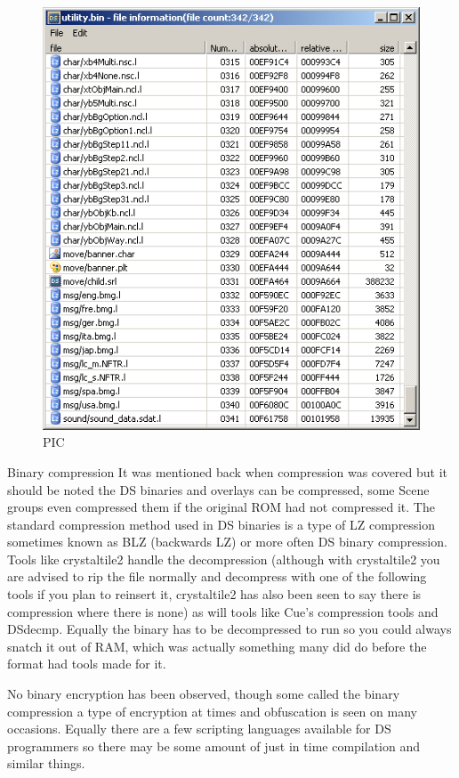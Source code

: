 \documentclass[
]{book}
\begin{document}
\begin{figure}
\centering
\includegraphics{images/215_home_fast6191_romhackingguide_unrenamed_fil___riginal_borders_romhackguide_downloadplay_1.png}
\caption{PIC}
\end{figure}

Binary compression It was mentioned back when compression was covered but it should be noted the DS binaries and overlays can be compressed, some Scene groups even compressed them if the original ROM had not compressed it. The standard compression method used in DS binaries is a type of LZ compression sometimes known as BLZ (backwards LZ) or more often DS binary compression. Tools like crystaltile2 handle the decompression (although with crystaltile2 you are advised to rip the file normally and decompress with one of the following tools if you plan to reinsert it, crystaltile2 has also been seen to say there is compression where there is none) as will tools like Cue's compression tools and DSdecmp. Equally the binary has to be decompressed to run so you could always snatch it out of RAM, which was actually something many did do before the format had tools made for it.

No binary encryption has been observed, though some called the binary compression a type of encryption at times and obfuscation is seen on many occasions. Equally there are a few scripting languages available for DS programmers so there may be some amount of just in time compilation and similar things.
\end{document}
